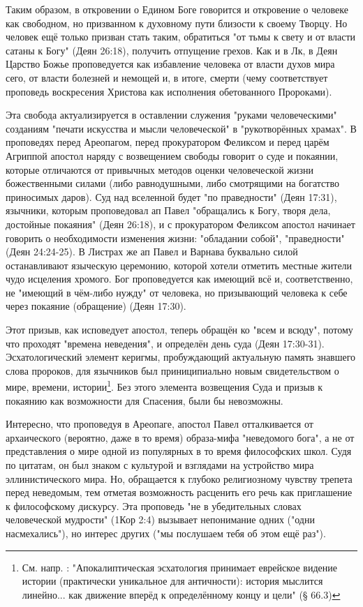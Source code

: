Таким образом, в откровении о Едином Боге говорится и откровение о человеке как свободном, но призванном к духовному пути близости к своему Творцу.
Но человек ещё только призван стать таким, обратиться "от тьмы к свету и от власти сатаны к Богу" (Деян 26:18), получить отпущение грехов.
Как и в Лк, в Деян Царство Божье проповедуется как избавление человека от власти духов мира сего, от власти болезней и немощей и, в итоге, смерти (чему соответствует проповедь воскресения Христова как исполнения обетованного Пророками).


Эта свобода актуализируется в оставлении служения "руками человеческими" созданиям "печати искусства и мысли человеческой" в "рукотворённых храмах".
В проповедях перед Ареопагом, перед прокуратором Феликсом и перед царём Агриппой апостол наряду с возвещением свободы говорит о суде и покаянии, которые отличаются от привычных методов оценки человеческой жизни божественными силами (либо равнодушными, либо смотрящими на богатство приносимых даров).
Суд над вселенной будет "по праведности" (Деян 17:31), язычники, которым проповедовал ап Павел "обращались к Богу, творя дела, достойные покаяния" (Деян 26:18), и с прокуратором Феликсом апостол начинает говорить о необходимости изменения жизни: "обладании собой", "праведности" (Деян 24:24-25).
В Листрах же ап Павел и Варнава буквально силой останавливают языческую церемонию, которой хотели отметить местные жители чудо исцеления хромого.
Бог проповедуется как имеющий всё и, соответственно, не "имеющий в чём-либо нужду" от человека, но призывающий человека к себе через покаяние (обращение) (Деян 17:30).


Этот призыв, как исповедует апостол, теперь обращён ко "всем и всюду", потому что проходят "времена неведения", и определён день суда (Деян 17:30-31). 
Эсхатологический элемент керигмы, пробуждающий актуальную память знавшего слова пророков, для язычников был приниципиально новым свидетельством о мире, времени, истории\footnote{См. напр. \cite{@dunn.vvedenie}: "Апокалиптическая эсхатология принимает еврейское видение истории (практически уникальное для античности): история мыслится линейно... как движение вперёд к определённому концу и цели" (§ 66.3)}.
Без этого элемента возвещения Суда и призыв к покаянию как возможности для Спасения, были бы невозможны.


Интересно, что проповедуя в Ареопаге, апостол Павел отталкивается от архаического (вероятно, даже в то время) образа-мифа "неведомого бога", а не от представления о мире одной из популярных в то время философских школ.
Судя по цитатам, он был знаком с культурой и взглядами на устройство мира эллинистического мира.
Но, обращается к глубоко религиозному чувству трепета перед неведомым, тем отметая возможность расценить его речь как приглашение к философскому дискурсу.
Эта проповедь "не в убедительных словах человеческой мудрости" (1Кор 2:4) вызывает непонимание одних ("одни насмехались"), но интерес других ("мы послушаем тебя об этом ещё раз").


